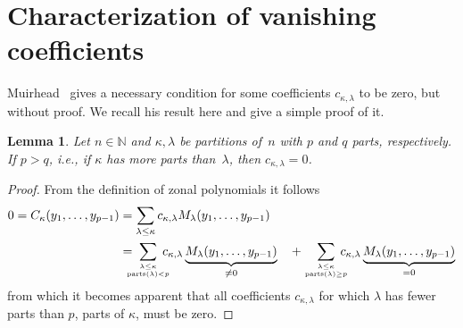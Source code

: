 \documentclass[10pt,oneside,american]{amsart}
\numberwithin{equation}{section}
\numberwithin{figure}{section}
\theoremstyle{plain}
\theoremstyle{definition}
\theoremstyle{remark}
\theoremstyle{plain}
\theoremstyle{definition}
\theoremstyle{plain}
\newtheorem{lemma}[thm]{Lemma}
\theoremstyle{plain}
\begin{document}
\section{Characterization of vanishing coefficients}

Muirhead~\cite[Lem.~7.2.3]{Muirhead} gives a necessary condition for some
coefficients $c_{\kappa,\lambda}$ to be zero, but without proof. We recall his
result here and give a simple proof of it.
\begin{lemma}\label{lem:zero1}
  Let $n\in\mathbb{N}$ and $\kappa,\lambda$ be partitions of~$n$ with $p$ and
  $q$ parts, respectively. If $p>q$, i.e., if $\kappa$ has more parts
  than~$\lambda$, then $c_{\kappa,\lambda}=0$.
\end{lemma}
\begin{proof}
  From the definition of zonal polynomials it follows
  \begin{align*}
    0 = C_{\kappa}(y_1,\dots,y_{p-1}) &=
    \sum_{\lambda\leq\kappa} c_{\kappa,\lambda} M_{\lambda}(y_1,\dots,y_{p-1}) \\
    &= \!\!\!\!\!\sum_{\genfrac{}{}{0pt}{}{\lambda\leq\kappa}{\operatorname{parts}(\lambda)<p}}\!\!\!\!\!
      c_{\kappa,\lambda} \underbrace{M_{\lambda}(y_1,\dots,y_{p-1})}_{\neq0} \quad +
    \sum_{\genfrac{}{}{0pt}{}{\lambda\leq\kappa}{\operatorname{parts}(\lambda)\geq p}}\!\!\!\!\!
      c_{\kappa,\lambda} \underbrace{M_{\lambda}(y_1,\dots,y_{p-1})}_{=0}
  \end{align*}
  from which it becomes apparent that all coefficients $c_{\kappa,\lambda}$
  for which $\lambda$ has fewer parts than $p$, parts of $\kappa$, 
  must be zero.
\end{proof}
\end{document}
